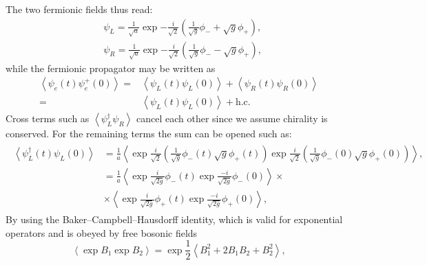 The two fermionic fields thus read:
\begin{equation}
    \begin{aligned}
         & \psi_{L}=\frac{1}{\sqrt{a}} \exp{-\frac{i}{\sqrt{2}}\left(\frac{1}{\sqrt{g}} \phi_{-}+\sqrt{g} \phi_{+}\right)}, \\
         & \psi_{R}=\frac{1}{\sqrt{a}} \exp{-\frac{i}{\sqrt{2}}\left(\frac{1}{\sqrt{g}} \phi_{-}-\sqrt{g} \phi_{+}\right)},
    \end{aligned}
\end{equation}
%
while the fermionic propagator may be written as
\begin{equation}
    \begin{aligned}
        \left\langle\psi_{e}(t) \psi_{e}^+(0)\right\rangle= & \left\langle\psi_{L}(t) \psi_{L}(0)\right\rangle+\left\langle\psi_{R}(t) \psi_{R}(0)\right\rangle \\
        =                                                   & \left\langle\psi_{L}(t) \psi_{L}(0)\right\rangle+ \text{h.c.}
    \end{aligned}
\end{equation}
%
Cross terms such as $\left\langle\psi_{L}^{\dagger} \psi_{R}\right\rangle$ cancel each other since we assume chirality is conserved. For the remaining terms the sum can be opened such as:
%
\begin{align}
    \begin{split}
        \left\langle\psi_{L}^{\dagger}(t) \psi_{L}(0)\right\rangle & = \frac{1}{a}\left\langle \exp{\frac{i}{\sqrt{2}}(\frac{1}{\sqrt{g}}\phi_{-}(t) \sqrt{g}\phi_{+}(t))} \exp{\frac{i}{\sqrt{2}}(\frac{1}{\sqrt{g}}\phi_{-}(0) \sqrt{g}\phi_{+}(0))}\right\rangle, \\
        & = \frac{1}{a}\left\langle \exp{\frac{i}{\sqrt{2g}}\phi_{-}(t)} \exp{\frac{-i}{\sqrt{2g}}\phi_{-}(0)}\right\rangle\times                                                                         \\
        & \times\left\langle \exp{\frac{i}{\sqrt{2g}}\phi_{+}(t)} \exp{\frac{-i}{\sqrt{2g}}\phi_{+}(0)}\right\rangle,
    \end{split}
\end{align}
%
By using the Baker--Campbell--Hausdorff identity, which is valid for exponential operators and is obeyed by free bosonic fields
%
\begin{equation}
    \left\langle \exp{B_{1}} \exp{B_{2}}\right\rangle=\exp{\frac{1}{2}}\left\langle B_{1}^{2}+2 B_{1} B_{2}+B_{2}^{2}\right\rangle,
\end{equation}
